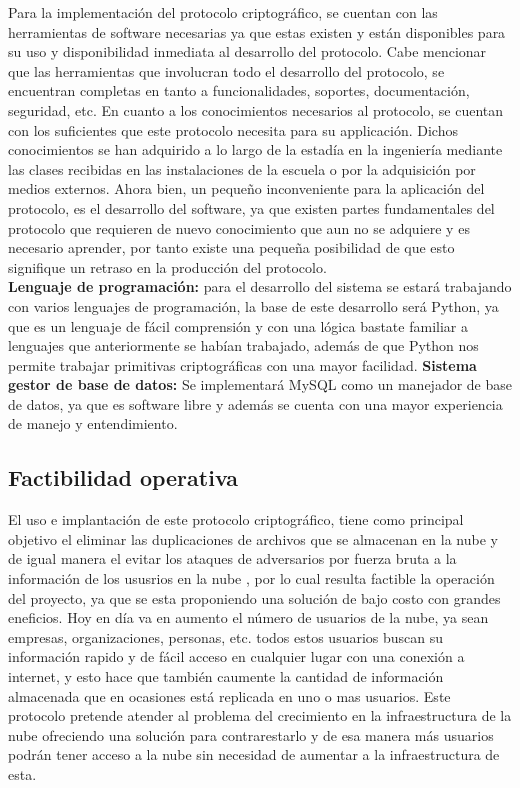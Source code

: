 Para la implementación del protocolo criptográfico, se cuentan con las herramientas de software necesarias ya que estas existen y están disponibles para su uso y disponibilidad inmediata al desarrollo del protocolo. Cabe mencionar que las herramientas que involucran todo el desarrollo del protocolo, se encuentran completas en tanto a funcionalidades, soportes, documentación, seguridad, etc. 
En cuanto a los conocimientos necesarios al protocolo, se cuentan con los suficientes que este protocolo necesita para su applicación. Dichos conocimientos se han adquirido a lo largo de la estadía en la ingeniería mediante las clases recibidas en las instalaciones de la  escuela o por la adquisición por medios externos. Ahora bien, un pequeño inconveniente para la aplicación del protocolo, es el desarrollo del software, ya que existen partes fundamentales del protocolo que requieren de nuevo conocimiento que aun no se adquiere y es necesario aprender, por tanto existe una pequeña posibilidad de que esto signifique un retraso en la producción del protocolo. 
\\
\textbf{Lenguaje de programación:} para el desarrollo del sistema se estará trabajando con varios lenguajes de programación, la base de este desarrollo será Python, ya que es un lenguaje de fácil comprensión y con una lógica bastate familiar a lenguajes que anteriormente se habían trabajado, además de que Python nos permite trabajar primitivas criptográficas con una mayor facilidad.
\textbf{Sistema gestor de base de datos:} Se implementará MySQL como un manejador de base de datos, ya que es software libre y además se cuenta con una mayor experiencia de manejo y entendimiento. 

\subsection{Factibilidad operativa}
El uso e implantación de este protocolo criptográfico, tiene como principal objetivo el eliminar las duplicaciones de archivos que se almacenan en la nube y de igual manera el evitar los ataques de adversarios por fuerza bruta a la información de los ususrios en la nube , por lo cual resulta factible la operación del proyecto, ya que se esta proponiendo una solución de bajo costo con grandes eneficios.
Hoy en día va en aumento el número de usuarios de la nube, ya sean empresas, organizaciones, personas, etc. todos estos usuarios buscan su información rapido y de fácil acceso en cualquier lugar con una conexión a internet, y esto hace que también caumente la cantidad de información almacenada que en ocasiones está replicada en uno o mas usuarios.
Este protocolo pretende atender al problema del crecimiento en la infraestructura de la nube ofreciendo una solución para contrarestarlo y de esa manera más usuarios podrán tener acceso a la nube sin necesidad de aumentar a la infraestructura de esta.



